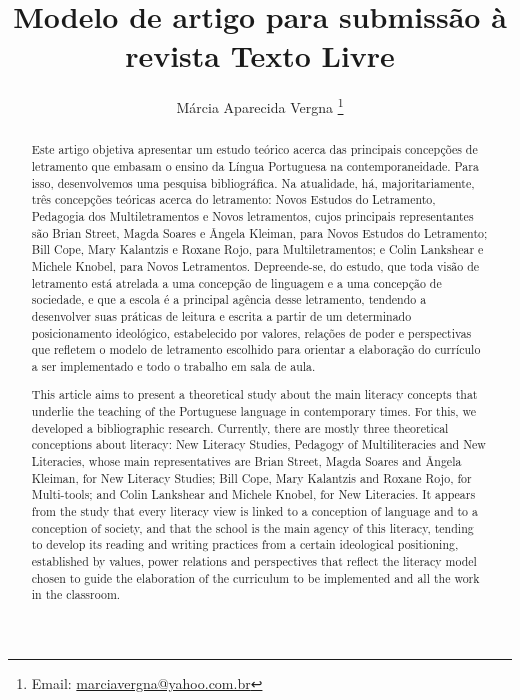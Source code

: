 \documentclass{textolivre}
\title{Modelo de artigo para submissão à revista Texto Livre}
\author[1]{Márcia Aparecida Vergna \thanks{Email: \url{marciavergna@yahoo.com.br}}}
\affil[1]{Universidade Estácio de Sá, Brasil.}
\begin{document}
\maketitle

\begin{poliabstract}
\begin{abstract}
Este artigo objetiva apresentar um estudo teórico acerca das principais
concepções de letramento que embasam o ensino da Língua Portuguesa na
contemporaneidade. Para isso, desenvolvemos uma pesquisa bibliográfica. Na
atualidade, há, majoritariamente, três concepções teóricas acerca do
letramento: Novos Estudos do Letramento, Pedagogia dos Multiletramentos e Novos
letramentos, cujos principais representantes são Brian Street, Magda Soares e
Ângela Kleiman, para Novos Estudos do Letramento; Bill Cope, Mary Kalantzis e
Roxane Rojo, para Multiletramentos; e Colin Lankshear e Michele Knobel, para
Novos Letramentos. Depreende-se, do estudo, que toda visão de letramento está
atrelada a uma concepção de linguagem e a uma concepção de sociedade, e que a
escola é a principal agência desse letramento, tendendo a desenvolver suas
práticas de leitura e escrita a partir de um determinado posicionamento
ideológico, estabelecido por valores, relações de poder e perspectivas que
refletem o modelo de letramento escolhido para orientar a elaboração do
currículo a ser implementado e todo o trabalho em sala de aula.

\end{abstract}

\begin{english}
\begin{abstract}
This article aims to present a theoretical study about the main literacy
concepts that underlie the teaching of the Portuguese language in contemporary
times. For this, we developed a bibliographic research. Currently, there are
mostly three theoretical conceptions about literacy: New Literacy Studies,
Pedagogy of Multiliteracies and New Literacies, whose main representatives are
Brian Street, Magda Soares and Ângela Kleiman, for New Literacy Studies; Bill
Cope, Mary Kalantzis and Roxane Rojo, for Multi-tools; and Colin Lankshear and
Michele Knobel, for New Literacies. It appears from the study that every
literacy view is linked to a conception of language and to a conception of
society, and that the school is the main agency of this literacy, tending to
develop its reading and writing practices from a certain ideological
positioning, established by values, power relations and perspectives that
reflect the literacy model chosen to guide the elaboration of the curriculum to
be implemented and all the work in the classroom.

\end{abstract}
\end{english}

\end{poliabstract}
\end{document}
